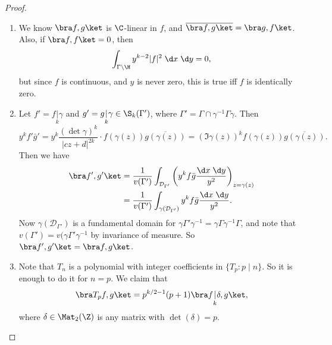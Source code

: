 \documentclass[a4paper]{article}
\begin{document}
\begin{proof}\leavevmode
  \begin{enumerate}
    \item We know $\bra f, g\ket$ is $\C$-linear in $f$, and $\overline{\bra f, g\ket} = \bra g, f\ket$. Also, if $\bra f, f \ket = 0$, then
      \[
        \int_{\Gamma \setminus \H} y^{k - 2} |f|^2 \;\d x \;\d y = 0,
      \]
      but since $f$ is continuous, and $y$ is never zero, this is true iff $f$ is identically zero.
    \item Let $f' = f\underset{k}{|} \gamma$ and $g' = g \underset{k}{|}\gamma \in \S_k(\Gamma')$, where $\Gamma' = \Gamma \cap \gamma^{-1} \Gamma \gamma$. Then
      \[
        y^k f' \bar{g}' = y^k \frac{(\det \gamma)^k}{|cz + d|^{2k}} \cdot f(\gamma(z)) \overline{g(\gamma(z))} = (\Im \gamma(z))^k f(\gamma(z)) \overline{g(\gamma(z))}.
      \]
      Then we have
      \begin{align*}
        \bra f', g'\ket &= \frac{1}{v(\Gamma')} \int_{\mathcal{D}_{\Gamma'}} \left(y^k f \bar{g} \frac{\d x\;\d y}{y^2}\right)_{z = \gamma(z)} \\
        &= \frac{1}{v(\Gamma')} \int_{\gamma(\mathcal{D}_{\Gamma'})} y^k f \bar{g} \frac{\d x\;\d y}{y^2}.
      \end{align*}
      Now $\gamma(\mathcal{D}_{\Gamma'})$ is a fundamental domain for $\gamma \Gamma'\gamma^{-1} = \gamma \Gamma \gamma^{-1} \Gamma$, and note that $v(\Gamma') = v(\gamma \Gamma' \gamma^{-1}$ by invariance of measure. So $\bra f', g'\ket = \bra f, g\ket$.
    \item Note that $T_n$ is a polynomial with integer coefficients in $\{T_p : p \mid n\}$. So it is enough to do it for $n = p$. We claim that
      \[
        \bra T_p f, g\ket = p^{k/2 - 1} (p + 1) \bra f\underset{k}{|} \delta, g\ket,
      \]
      where $\delta \in \Mat_2(\Z)$ is any matrix with $\det (\delta) = p$.


\end{enumerate}
\end{proof}
\end{document}
